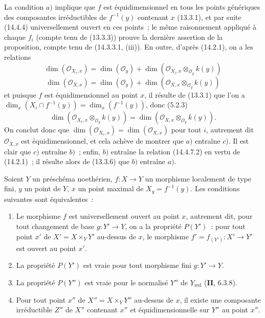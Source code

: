 La condition $a)$ implique que $f$ est équidimensionnel en tous les points
génériques des composantes irréductibles de $f^{-1}(y)$ contenant $x$ (13.3.1), et
par suite (14.4.4) universellement ouvert en ces points~; le même raisonnement
appliqué à chaque $f_i$ (compte tenu de (13.3.3)) prouve la dernière assertion de
la proposition, compte tenu de (14.3.3.1, (iii)). En outre, d'après (14.2.1), on a
les relations
\begin{equation}
\tag{14.4.7.1}
\label{IV.14.4.7.1-fr}
  \dim(\mathcal O_{X_i,x})=\dim(\mathcal O_y)+
  \dim(\mathcal O_{X_i,x}\otimes_{\mathcal O_y}k(y))
\end{equation}
\begin{equation}
\tag{14.4.7.2}
\label{IV.14.4.7.2-fr}
  \dim(\mathcal O_{X,x})=\dim(\mathcal O_y)+
  \dim(\mathcal O_{X,x}\otimes_{\mathcal O_y}k(y))
\end{equation}
et puisque $f$ est équidimensionnel au point $x$, il résulte de (13.3.1) que l'on
a $\dim_x(X_i\cap f^{-1}(y))=\dim_x(f^{-1}(y))$, donc (5.2.3)
\[
  \dim(\mathcal O_{X_i,x}\otimes_{\mathcal O_y}k(y))=
  \dim(\mathcal O_{X,x}\otimes_{\mathcal O_y}k(y)).
\]
On conclut donc que $\dim(\mathcal O_{X_i,x})=\dim(\mathcal O_{X,x})$ pour tout
$i$, autrement dit $\mathcal O_{X,x}$ est équidimensionnel, et cela achève de
montrer que $a)$ entraîne $c)$. Il est clair que $c)$ entraîne $b)$~; enfin, $b)$
entraîne la relation (14.4.7.2) en vertu de (14.2.1)~; il résulte alors de (13.3.6)
que $b)$ entraîne $a)$.

\begin{proposition}[14.4.8]
\label{IV.14.4.8-fr}
Soient $Y$ un préschéma noethérien, $f:X\to Y$ un morphisme localement de type
fini, $y$ un point de $Y$, $x$ un point maximal de $X_y=f^{-1}(y)$. Les conditions
suivantes sont équivalentes~:
\begin{enumerate}[label=\emph{\alph*)}]
  \item Le morphisme $f$ est universellement ouvert au point $x$, autrement dit,
  pour tout changement de base $g:Y'\to Y$, on a la propriété $P(Y')$~: pour tout
  point $x'$ de $X'=X\times_Y Y'$ au-dessus de $x$, le morphisme
  $f'=f_{(Y')}:X'\to Y'$ est ouvert au point $x'$.


  \item[a$'$)] La propriété $P(Y')$ est vraie pour tout morphisme fini
  $g:Y'\to Y$.
  \item[a$''$)] La propriété $P(Y'')$ est vraie pour le normalisé $Y''$ de
  $Y_{\mathrm{red}}$ (\textbf{II}, 6.3.8).
  \item Pour tout point $x''$ de $X''=X\times_Y Y''$ au-dessus de $x$, il existe
  une composante irréductible $Z''$ de $X''$ contenant $x''$ et
  équidimensionnelle sur $Y''$ au point $x''$.
\end{enumerate}
\end{proposition}

